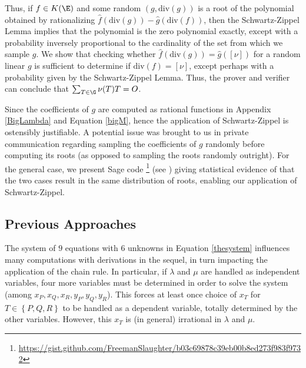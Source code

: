 \documentclass[11pt,letterpaper]{article}
\theoremstyle{definition}
\newcommand{\6}{\mathbf}
\newcommand{\7}{\mathcal}
\begin{document}
Thus, if $f \in K(\E)$ and some random $(g, \text{div}(g))$ is a root of the polynomial obtained by rationalizing $\widehat{f}(\text{div}(g)) - \widehat{g}(\text{div}(f))$, then the Schwartz-Zippel Lemma implies that the polynomial is the zero polynomial exactly, except with a probability inversely proportional to the cardinality of the set from which we sample $g$. 
We show that checking whether $\widehat{f}(\text{div}(g)) = \widehat{g}([\nu])$ for a random linear $g$ is sufficient to determine if $\text{div}(f) = [\nu]$, except perhaps with a probability given by the Schwartz-Zippel Lemma. Thus, the prover and verifier can conclude that $\sum_{T \in \G} \nu(T) T = O$.

Since the coefficients of $g$ are computed as rational functions in Appendix \ref{BigLambda} and Equation \ref{bigM}, hence the application of Schwartz-Zippel is ostensibly justifiable. 
A potential issue was brought to us in private communication \cite{bassapersonal} regarding sampling the coefficients of $g$ randomly before computing its roots (as opposed to sampling the roots randomly outright). 
For the general case, we present Sage code \footnote{\url{https://gist.github.com/FreemanSlaughter/b03c69878c39eb00b8ed273f983f9732}} (see  \cite{freemanslaughter_gist}) giving statistical evidence of that the two cases result in the same distribution of roots, enabling our application of Schwartz-Zippel.



\subsection{Previous Approaches}
The system of $9$ equations with $6$ unknowns in Equation \ref{thesystem} influences many computations with derivations in the sequel, in turn impacting the application of the chain rule. %
In particular, if $\lambda$ and $\mu$ are handled as independent variables, four more variables must be determined in order to solve the system (among $x_P, x_Q, x_R, y_P, y_Q, y_R$). This forces at least once choice of $x_T$ for $T \in \left\{P,Q,R\right\}$ to be handled as a dependent variable, totally determined by the other variables. However, this $x_T$ is (in general) irrational in $\lambda$ and $\mu$.
\end{document}
